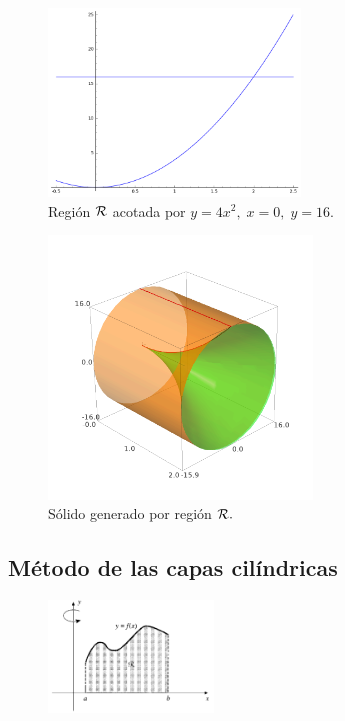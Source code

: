 \begin{figure}[h]
 \centering
 \includegraphics[height=5cm]{./calculo/sage0503.png}
 \caption{Regi\'on $\mathcal{R}$ acotada por $y=4x^{2}, \; x=0, \;y=16.$}
 \label{fig:sage:0503}
\end{figure}




\begin{figure}[h]
 \centering
 \includegraphics[height=7cm]{./calculo/sage0504.png}
 \caption{S\'olido generado por regi\'on $\mathcal{R}.$}
 \label{fig:sage:0504}
\end{figure}



\subsection{M\'etodo de las capas cil\'indricas}


\begin{figure}
 \centering
 \includegraphics[height=3cm,keepaspectratio=true]{./calculo/fig3007.png}
 \label{fig:3007}
\end{figure}

